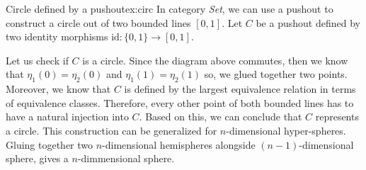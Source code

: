 \begin{example}{Circle defined by a pushout}{ex:circ}
In category \emph{Set}, we can use a pushout to construct a circle out of two bounded lines $[0, 1]$. Let $C$ be a pushout defined by two identity morphisms $\textrm{id}: \{0, 1\} \rightarrow  [0, 1]$.

\begin{center}
\end{center}
Let us check if $C$ is a circle. Since the diagram above commutes, then we know that $\eta_1(0) = \eta_2(0)$ and $\eta_1(1) = \eta_2(1)$ so, we glued together two points. Moreover, we know that $C$ is defined by the largest equivalence relation in terms of equivalence classes. Therefore, every other point of both bounded lines has to have a natural injection into $C$. Based on this, we can conclude that $C$ represents a circle. This construction can be generalized for $n$-dimensional hyper-spheres. Gluing together two $n$-dimensional hemispheres alongside $(n-1)$-dimensional sphere, gives a $n$-dimmensional sphere.
\end{example}


